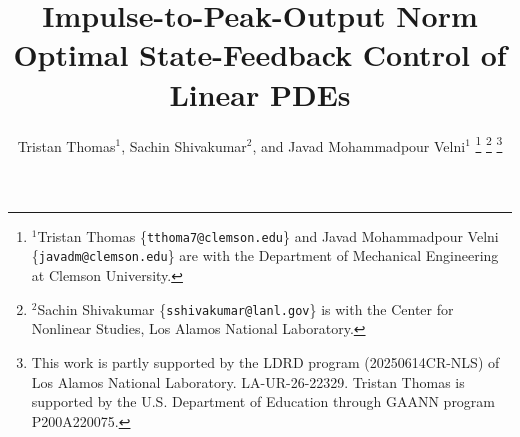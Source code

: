 \documentclass[letterpaper, 10 pt, conference]{ieeeconf}
\theoremstyle{definition}
\begin{document}
\title{\LARGE \bf Impulse-to-Peak-Output Norm Optimal State-Feedback Control of Linear PDEs}%
\author{Tristan Thomas$^{1}$, Sachin Shivakumar$^{2}$, and Javad Mohammadpour Velni$^{1}$
\thanks{$^{1}$Tristan Thomas \{{\tt\small tthoma7@clemson.edu}\} and Javad Mohammadpour Velni \{{\tt\small javadm@clemson.edu}\} are with the Department of Mechanical Engineering at Clemson University.}%
\thanks{$^{2}$Sachin Shivakumar \{{\tt\small sshivakumar@lanl.gov}\} is with the Center for Nonlinear Studies, Los Alamos National Laboratory. }%
\thanks{This work is partly supported by the LDRD program (20250614CR-NLS) of Los Alamos National Laboratory. LA-UR-26-22329. Tristan Thomas is supported by the U.S. Department of Education through GAANN program P200A220075.}
}



\maketitle
\end{document}
